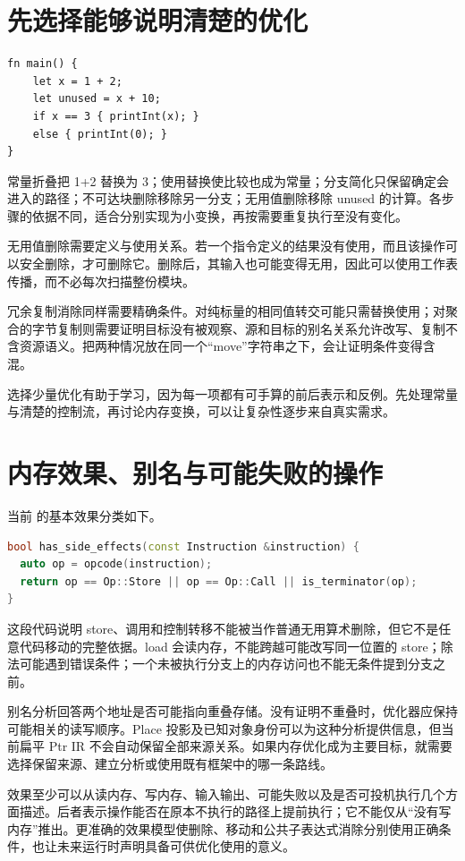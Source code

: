 \section{先选择能够说明清楚的优化}
\begin{lstlisting}[language=Rustless,caption={常量折叠、分支简化与无用值删除可以相互配合}]
fn main() {
    let x = 1 + 2;
    let unused = x + 10;
    if x == 3 { printInt(x); }
    else { printInt(0); }
}
\end{lstlisting}
常量折叠把 1+2 替换为 3；使用替换使比较也成为常量；分支简化只保留确定会进入的路径；不可达块删除移除另一分支；无用值删除移除 unused 的计算。各步骤的依据不同，适合分别实现为小变换，再按需要重复执行至没有变化。

无用值删除需要定义与使用关系。若一个指令定义的结果没有使用，而且该操作可以安全删除，才可删除它。删除后，其输入也可能变得无用，因此可以使用工作表传播，而不必每次扫描整份模块。

冗余复制消除同样需要精确条件。对纯标量的相同值转交可能只需替换使用；对聚合的字节复制则需要证明目标没有被观察、源和目标的别名关系允许改写、复制不含资源语义。把两种情况放在同一个“move”字符串之下，会让证明条件变得含混。

选择少量优化有助于学习，因为每一项都有可手算的前后表示和反例。先处理常量与清楚的控制流，再讨论内存变换，可以让复杂性逐步来自真实需求。

\section{内存效果、别名与可能失败的操作}
当前  的基本效果分类如下。
\begin{lstlisting}[language=C++,caption={当前效果查询适合保守的基本分类}]
bool has_side_effects(const Instruction &instruction) {
  auto op = opcode(instruction);
  return op == Op::Store || op == Op::Call || is_terminator(op);
}
\end{lstlisting}
这段代码说明 store、调用和控制转移不能被当作普通无用算术删除，但它不是任意代码移动的完整依据。load 会读内存，不能跨越可能改写同一位置的 store；除法可能遇到错误条件；一个未被执行分支上的内存访问也不能无条件提到分支之前。

别名分析回答两个地址是否可能指向重叠存储。没有证明不重叠时，优化器应保持可能相关的读写顺序。Place 投影及已知对象身份可以为这种分析提供信息，但当前扁平 Ptr IR 不会自动保留全部来源关系。如果内存优化成为主要目标，就需要选择保留来源、建立分析或使用既有框架中的哪一条路线。

效果至少可以从读内存、写内存、输入输出、可能失败以及是否可投机执行几个方面描述。后者表示操作能否在原本不执行的路径上提前执行；它不能仅从“没有写内存”推出。更准确的效果模型使删除、移动和公共子表达式消除分别使用正确条件，也让未来运行时声明具备可供优化使用的意义。


